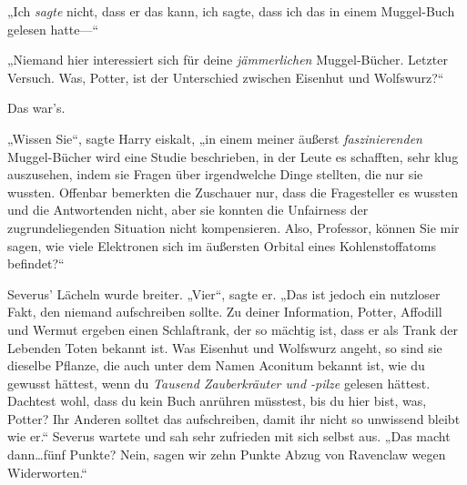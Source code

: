 „Ich \emph{sagte} nicht, dass er das kann, ich sagte, dass ich das in einem Muggel-Buch gelesen hatte—“

„Niemand hier interessiert sich für deine \emph{jämmerlichen} Muggel-Bücher. Letzter Versuch. Was, Potter, ist der Unterschied zwischen Eisenhut und Wolfswurz?“

Das war’s.

„Wissen Sie“, sagte Harry eiskalt, „in einem meiner äußerst \emph{faszinierenden} Muggel-Bücher wird eine Studie beschrieben, in der Leute es schafften, sehr klug auszusehen, indem sie Fragen über irgendwelche Dinge stellten, die nur sie wussten. Offenbar bemerkten die Zuschauer nur, dass die Fragesteller es wussten und die Antwortenden nicht, aber sie konnten die Unfairness der zugrundeliegenden Situation nicht kompensieren. Also, Professor, können Sie mir sagen, wie viele Elektronen sich im äußersten Orbital eines Kohlenstoffatoms befindet?“

Severus’ Lächeln wurde breiter. „Vier“, sagte er. „Das ist jedoch ein nutzloser Fakt, den niemand aufschreiben sollte. Zu deiner Information, Potter, Affodill und Wermut ergeben einen Schlaftrank, der so mächtig ist, dass er als Trank der Lebenden Toten bekannt ist. Was Eisenhut und Wolfswurz angeht, so sind sie dieselbe Pflanze, die auch unter dem Namen Aconitum bekannt ist, wie du gewusst hättest, wenn du \emph{Tausend Zauberkräuter und -pilze} gelesen hättest. Dachtest wohl, dass du kein Buch anrühren müsstest, bis du hier bist, was, Potter? Ihr Anderen solltet das aufschreiben, damit ihr nicht so unwissend bleibt wie er.“ Severus wartete und sah sehr zufrieden mit sich selbst aus. „Das macht dann…fünf Punkte? Nein, sagen wir zehn Punkte Abzug von Ravenclaw wegen Widerworten.“

